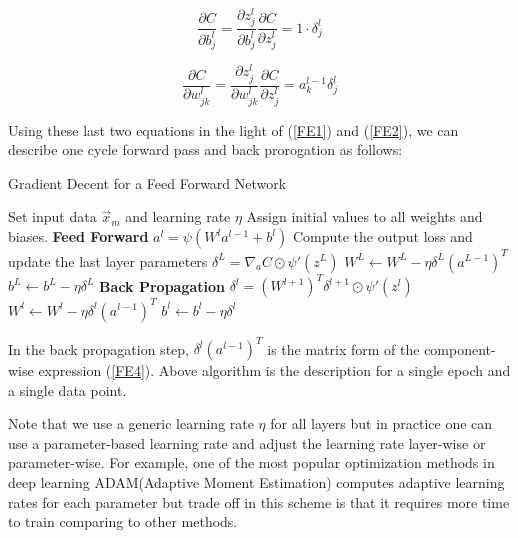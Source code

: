 \documentclass[12pt]{article}
\begin{document}
\begin{tcolorbox}
\begin{equation}
\label{FE3}
\dfrac{\partial C}{\partial b_{j}^{l}} = \dfrac{\partial z_{j}^{l}}{\partial b_{j}^{l}}  \dfrac{\partial C}{\partial z_{j}^{l}} = 1\cdot \delta_{j}^{l}
\end{equation}

\begin{equation}
\label{FE4}
\dfrac{\partial C}{\partial w_{jk}^{l}} = \dfrac{\partial z_{j}^{l}}{\partial w_{jk}^{l}}  \dfrac{\partial C}{\partial z_{j}^{l}} = a_{k}^{l-1} \delta_{j}^{l}
\end{equation}
\end{tcolorbox}

Using these last two equations in the light of (\ref{FE1}) and (\ref{FE2}), we can describe one cycle forward pass and back prorogation as follows:

\begin{algorithm}{}\label{alg:GD}
      \caption{Gradient Decent for a Feed Forward Network}
      \begin{algorithmic}
      \State Set input data $\vec{x}_{m}$ and learning rate $\eta$ 
      \State Assign initial values to all weights and biases. 
      \State \textbf{Feed Forward}
       \State $a^{l} =\psi( W^{l}a^{l-1}+b^{l}) $
       \EndFor
       \State Compute the output loss and update the last layer parameters
       \State $\delta^{L} = \nabla_{a} C \odot  \psi'(z^{L})$       
       \State $W^{L} \leftarrow W^{L} -\eta \delta^{L}(a^{L-1})^{T} $
       \State $b^{L} \leftarrow b^{L} -\eta \delta^{L} $
       \State \textbf{Back Propagation}
       \State $\delta^{l} =  (W^{l+1})^{T}\delta^{l+1} \odot \psi'(z^{l})$
       \State $W^{l} \leftarrow W^{l} -\eta \delta^{l}(a^{l-1})^{T} $
       \State $b^{l} \leftarrow b^{l} -\eta \delta^{l} $
       \EndFor
      \end{algorithmic}
    \end{algorithm} 
In the back propagation step, $\delta^{l}(a^{l-1})^{T}$ is the matrix form of the component-wise expression  (\ref{FE4}). Above algorithm is the description for a single epoch and a single data point. 

Note that we use a generic learning rate $\eta$ for all layers but in practice one can use a parameter-based learning rate and adjust the learning rate layer-wise or parameter-wise. For example, one of the most popular optimization methods in deep learning ADAM(Adaptive Moment Estimation)\cite{adam} computes adaptive learning rates for each parameter but trade off in this scheme is that it requires more time to train comparing to other methods.
\end{document}
